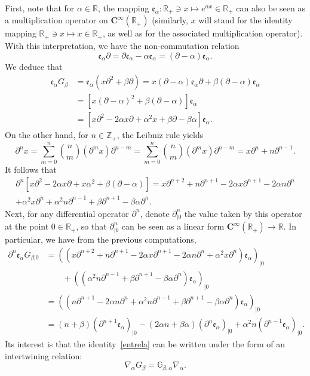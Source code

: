 \documentclass[AHL,Unicode,longabstracts]{cedram}
\newcommand{\cC}{{\mathbf C}}
\newcommand{\RR}{\mathbb{R}}
\newcommand{\ZZ}{\mathbb{Z}}
\newcommand{\fe}{\mathfrak{e}}
\newcommand{\iy}{\infty}
\newcommand{\lt}{\left}
\newcommand{\na}{\nabla}
\newcommand{\pa}{\partial}
\newcommand{\ri}{\rightarrow}
\newcommand{\rt}{\right}
\newcommand{\dBg}{{\discret{G}}}
\newcommand{\Bg}{G}
\newcommand{\discret}[1]{\mathds{#1}}
\begin{document}
First, note that for $\alpha\in\RR$, the mapping $ \fe_{\alpha} : \RR_+\ni x\mapsto e^{\alpha x}\in\RR_+ $ can also be seen as a multiplication operator on $\cC^\iy(\RR_+)$ (similarly, $x$ will stand for the identity mapping $\RR_+\ni x\mapsto x\in\RR_+$, as well as for the associated multiplication operator). With this interpretation, we have the non-commutation relation
\[
\fe_{\alpha}\pa=\pa \fe_{\alpha} -\alpha\fe_{\alpha} =(\pa-\alpha)\fe_{\alpha}.
\]
We deduce that
\begin{align*}
\fe_{\alpha}\Bg_{\beta}&=\fe_{\alpha}(x\pa^2+\beta\pa) =x (\pa-\alpha)\fe_{\alpha}\pa +\beta(\pa-\alpha)\fe_{\alpha}\\
&=[x(\pa-\alpha)^2+\beta(\pa-\alpha)]\fe_{\alpha}\\
&=[x\pa^2-2\alpha x\pa+\alpha^2x+\beta\pa-\beta\alpha]\fe_{\alpha}.
\end{align*}
On the other hand, for $n\in\ZZ_+$, the Leibniz rule yields
\[
\pa^n x=\sum_{m=0}^n\binom{n}{m} (\pa^mx)\pa^{n-m} =\sum_{m=0}^n\binom{n}{m} (\pa^mx)\pa^{n-m} =x\pa^n+n\pa^{n-1}.
\]
It follows that
\begin{multline*}
\pa^n[x\pa^2-2\alpha x\pa+x\alpha^2+\beta (\pa-\alpha)]=x\pa^{n+2}+n\pa^{n+1}-2\alpha x\pa^{n+1}-2\alpha n\pa^{n}\\
+\alpha^2x\pa^n+\alpha^2n\pa^{n-1}+\beta\pa^{n+1}-\beta\alpha\pa^n.
\end{multline*}
Next, for any differential operator $\pa^n$, denote $\pa^n_{\vert 0}$ the value taken by this operator at the point $0\in\RR_+$, so that $\pa^n_{\vert 0}$ can be seen as a linear form $\cC^\iy(\RR_+)\ri\RR$. In particular, we have from the previous computations,
\begin{align}
\nonumber\pa^n\fe_{\alpha}\Bg_{\beta\vert 0}&=\lt((x\pa^{n+2}+n\pa^{n+1}-2\alpha x\pa^{n+1}-2\alpha n\pa^{n} +\alpha^2x\pa^n)\fe_{\alpha}\rt)_{\vert 0}\\
&\qquad +\lt((\alpha^2n\pa^{n-1}+\beta\pa^{n+1}-\beta\alpha\pa^n)\fe_{\alpha}\rt)_{\vert 0}\nonumber \\
\nonumber
&=\lt((n\pa^{n+1}-2\alpha n\pa^{n} +\alpha^2n\pa^{n-1}+\beta\pa^{n+1}-\beta\alpha\pa^n)\fe_{\alpha}\rt)_{\vert 0}\\
&=(n+\beta)(\pa^{n+1}\fe_{\alpha})_{\vert 0}-(2\alpha n+\beta\alpha)(\pa^{n}\fe_{\alpha})_{\vert 0}+\alpha^2n(\pa^{n-1}\fe_{\alpha})_{\vert 0}.\label{entrela}
\end{align}
Its interest is that the identity~\eqref{entrela} can be written under the form of an intertwining relation:
\begin{equation}\label{ab}
\na_{\alpha} \Bg_{\beta}=\dBg_{\beta,\alpha}\na_{\alpha}.
\end{equation}
\end{document}
